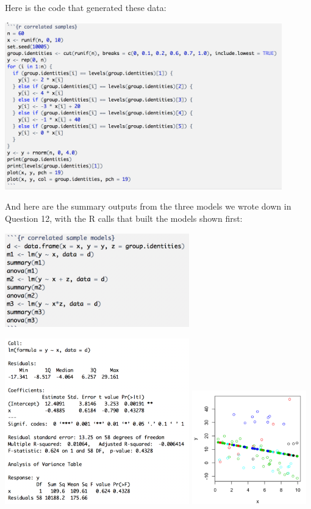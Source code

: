 \newpage

Here is the code that generated these data:
\begin{center}
\includegraphics[width=0.9\textwidth]{img/code-hierarchical-model.png}
\end{center}

And here are the summary outputs from the three models we wrote down in Question 12, with the R calls that built the models shown first:

\begin{center}
\includegraphics[width=0.6\textwidth]{img/code-models-123.png}
\end{center}

\begin{center}
\includegraphics[width=0.6\textwidth]{img/model-1-output.png}
\includegraphics[width=0.37\textwidth]{img/model-1-predictions.png}
\end{center}

